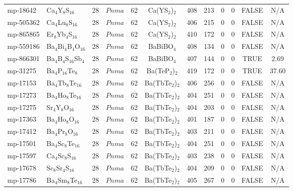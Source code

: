 {\begin{longtable}{llcccccccccc}
    mp-18642 & Ca$_{4}$Y$_{8}$S$_{16}$ & 28    & $Pnma$ & 62    & Ca(YS$_{2}$)$_{2}$ & 408   & 213   & 0     & 0     & FALSE & N/A \\
    mp-505362 & Ca$_{4}$Lu$_{8}$S$_{16}$ & 28    & $Pnma$ & 62    & Ca(YS$_{2}$)$_{2}$ & 406   & 215   & 0     & 0     & FALSE & N/A \\
    mp-865865 & Er$_{8}$Yb$_{4}$S$_{16}$ & 28    & $Pnma$ & 62    & Ca(YS$_{2}$)$_{2}$ & 410   & 172   & 0     & 0     & FALSE & N/A \\
    mp-559186 & Ba$_{4}$Bi$_{4}$B$_{4}$O$_{16}$ & 28    & $Pnma$ & 62    & BaBiBO$_{4}$ & 408   & 134   & 0     & 0     & FALSE & N/A \\
    mp-866301 & Ba$_{4}$B$_{4}$S$_{16}$Sb$_{4}$ & 28    & $Pnma$ & 62    & BaBiBO$_{4}$ & 407   & 144   & 0     & 0     & TRUE  & 2.69  \\
    mp-31275 & Ba$_{4}$P$_{16}$Te$_{8}$ & 28    & $Pnma$ & 62    & Ba(TeP$_{2}$)$_{2}$ & 419   & 172   & 0     & 0     & TRUE  & 37.60  \\
    mp-17153 & Ba$_{4}$Tb$_{8}$Te$_{16}$ & 28    & $Pnma$ & 62    & Ba(TbTe$_{2}$)$_{2}$ & 406   & 256   & 0     & 0     & FALSE & N/A \\
    mp-17273 & Ba$_{4}$Ho$_{8}$Te$_{16}$ & 28    & $Pnma$ & 62    & Ba(TbTe$_{2}$)$_{2}$ & 404   & 251   & 0     & 0     & FALSE & N/A \\
    mp-17275 & Sr$_{4}$Y$_{8}$O$_{16}$ & 28    & $Pnma$ & 62    & Ba(TbTe$_{2}$)$_{2}$ & 404   & 203   & 0     & 0     & FALSE & N/A \\
    mp-17363 & Ba$_{4}$Ho$_{8}$O$_{16}$ & 28    & $Pnma$ & 62    & Ba(TbTe$_{2}$)$_{2}$ & 401   & 187   & 0     & 0     & FALSE & N/A \\
    mp-17412 & Ba$_{4}$Pr$_{8}$O$_{16}$ & 28    & $Pnma$ & 62    & Ba(TbTe$_{2}$)$_{2}$ & 403   & 211   & 0     & 0     & FALSE & N/A \\
    mp-17501 & Ba$_{4}$Sc$_{8}$Te$_{16}$ & 28    & $Pnma$ & 62    & Ba(TbTe$_{2}$)$_{2}$ & 404   & 251   & 0     & 0     & FALSE & N/A \\
    mp-17597 & Ca$_{4}$Sc$_{8}$S$_{16}$ & 28    & $Pnma$ & 62    & Ba(TbTe$_{2}$)$_{2}$ & 403   & 238   & 0     & 0     & FALSE & N/A \\
    mp-17678 & Sc$_{8}$Sr$_{4}$S$_{16}$ & 28    & $Pnma$ & 62    & Ba(TbTe$_{2}$)$_{2}$ & 404   & 209   & 0     & 0     & FALSE & N/A \\
    mp-17786 & Ba$_{4}$Sm$_{8}$Te$_{16}$ & 28    & $Pnma$ & 62    & Ba(TbTe$_{2}$)$_{2}$ & 405   & 267   & 0     & 0     & FALSE & N/A \\

\end{longtable}}
